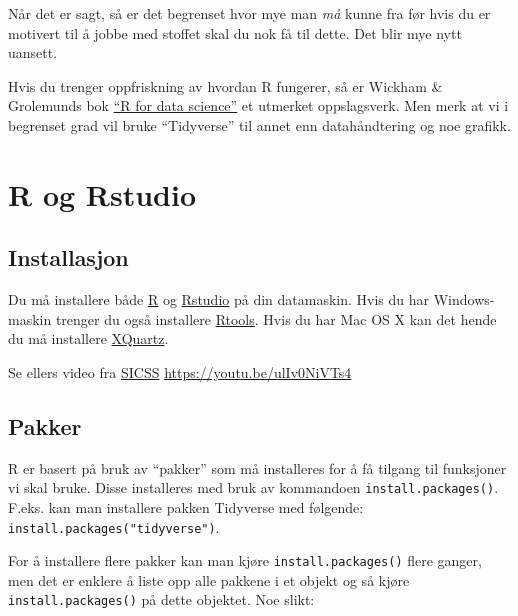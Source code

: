 \documentclass[
  letterpaper,
  DIV=11,
  numbers=noendperiod]{scrreprt}
\begin{document}
Når det er sagt, så er det begrenset hvor mye man \emph{må} kunne fra
før hvis du er motivert til å jobbe med stoffet skal du nok få til
dette. Det blir mye nytt uansett.

Hvis du trenger oppfriskning av hvordan R fungerer, så er Wickham \&
Grolemunds bok \href{https://r4ds.had.co.nz/}{``R for data science''} et
utmerket oppslagsverk. Men merk at vi i begrenset grad vil bruke
``Tidyverse'' til annet enn datahåndtering og noe grafikk.


\chapter*{R og Rstudio}\label{r-og-rstudio}


\section*{Installasjon}\label{installasjon}


Du må installere både \href{https://www.r-project.org/}{R} og
\href{https://posit.co/products/open-source/rstudio/}{Rstudio} på din
datamaskin. Hvis du har Windows-maskin trenger du også installere
\href{https://cran.r-project.org/bin/windows/Rtools/rtools42/rtools.html}{Rtools}.
Hvis du har Mac OS X kan det hende du må installere
\href{https://www.xquartz.org/}{XQuartz}.

Se ellers video fra \href{https://youtu.be/ulIv0NiVTs4}{SICSS}
\url{https://youtu.be/ulIv0NiVTs4}

\section*{Pakker}\label{pakker}


R er basert på bruk av ``pakker'' som må installeres for å få tilgang
til funksjoner vi skal bruke. Disse installeres med bruk av kommandoen
\texttt{install.packages()}. F.eks. kan man installere pakken Tidyverse
med følgende: \texttt{install.packages("tidyverse")}.

For å installere flere pakker kan man kjøre \texttt{install.packages()}
flere ganger, men det er enklere å liste opp alle pakkene i et objekt og
så kjøre \texttt{install.packages()} på dette objektet. Noe slikt:
\end{document}
